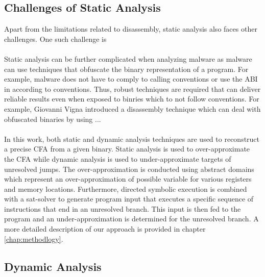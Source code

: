 \documentclass{kththesis}
\begin{document}
\subsection{Challenges of Static Analysis}
Apart from the limitations related to disassembly, static analysis also faces other challenges. One such challenge is 
\\ \\
Static analysis can be further complicated when analyzing malware as malware can use techniques that obfuscate the binary representation of a program\cite{StaticDisAndCodeAnal}. For example, malware does not have to comply to calling conventions or use the ABI in according to conventions. Thus, robust techniques are required that can deliver reliable results even when exposed to binries which to not follow conventions. For example, Giovanni Vigna introduced a disassembly technique which can deal with obfuscated binaries by using ..\cite{StaticDisAndCodeAnal}. 
\\ \\
In this work, both static and dynamic analysis techniques are used to reconstruct a precise CFA from a given binary. Static analysis is used to over-approximate the CFA while dynamic analysis is used to under-approximate targets of unresolved jumps. The over-approximation is conducted using abstract domains which represent an over-approximation of possible variable for various registers and memory locations. Furthermore, directed symbolic execution is combined with a sat-solver to generate program input that executes a specific sequence of instructions that end in an unresolved branch. This input is then fed to the program and an under-approximation is determined for the unresolved branch. A more detailed description of our approach is provided in chapter \ref{chap:methodlogy}.

\subsection{Dynamic Analysis}
\end{document}
